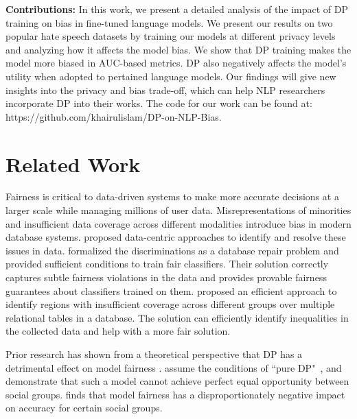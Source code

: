 \documentclass[11pt]{article} %
\begin{document}
\textbf{Contributions: }
In this work, we present a detailed analysis of the impact of DP training on bias in fine-tuned language models.  We present our results on two popular hate speech datasets by training our models at different privacy levels and analyzing how it affects the model bias. We show that DP training makes the model more biased in AUC-based metrics. DP also negatively affects the model's utility when adopted to pertained language models. 
Our findings will give new insights into the privacy and bias trade-off, which can help NLP researchers incorporate DP into their works. The code for our work can be found at: https://github.com/khairulislam/DP-on-NLP-Bias.

\section{Related Work }
\label{sec:related_work}

Fairness is critical to data-driven systems \cite{shahbazi2024coverage} to make more accurate decisions at a larger scale while managing millions of user data. Misrepresentations of minorities and insufficient data coverage across different modalities \cite{lin2020identifying} introduce bias in modern database systems. \cite{shahbazi2024coverage} proposed data-centric approaches to identify and resolve these issues in data. \cite{salimi2020database} formalized the discriminations as a database repair problem and provided sufficient conditions to train fair classifiers. Their solution correctly captures subtle fairness violations in the data and provides provable fairness guarantees about classifiers trained on them. \cite{lin2020identifying} proposed an efficient approach to identify regions with insufficient coverage across different groups over multiple relational tables in a database. The solution can efficiently identify inequalities in the collected data and help with a more fair solution.

Prior research has shown from a theoretical perspective that DP has a detrimental effect on model fairness \citep{cummingsfairness, trandpfairness}. \cite{cummingsfairness} assume the conditions of ``pure  DP"~\cite{dwork2006calibrating}, and demonstrate that such a model cannot achieve perfect equal opportunity between social groups.  \cite{trandpfairness} finds that model fairness has a disproportionately negative impact on accuracy for certain social groups. 
\end{document}
